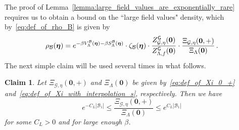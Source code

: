 \documentclass[11pt]{article}
\newtheorem{claim}[theorem]{Claim}
\theoremstyle{definition}
\theoremstyle{remark}
\numberwithin{theorem}{section}
\begin{document}
    \noindent
    The proof of Lemma~\ref{lemma:large_field_values_are_exponentially_rare} requires us to obtain a bound on the ``large field values" density, which by~\eqref{eq:def_of_rho_B} is given by
    \begin{equation*}
        \rho_{\mathcal{B}}(\boldsymbol{\eta}) = e^{-\beta V_{\Lambda}^{\mathcal{B}}(\boldsymbol{\eta})- \beta S_{\Lambda}^{\mathcal{B}}(\boldsymbol{\eta})} \cdot \zeta_{\mathcal{B}}(\boldsymbol{\eta}) \cdot \frac{Z_{\mathcal{G},\eta}^{\sf G}(\mathbf{0})}{Z_{\Lambda,f}^{\sf G}(\mathbf{0})} \cdot \frac{\Xi_{\mathcal{G},\eta}(\mathbf{0},+)}{\Xi_{\Lambda}(\mathbf{0})} \, .
    \end{equation*}
    The next simple claim will be used several times in what follows. 
    \begin{claim}
        \label{claim:two_sided_inequality_for_ratio_of_xi}
        Let $\Xi_{\mathcal{G},\eta}(\mathbf{0},+)$ and $\Xi_{\Lambda}(\mathbf{0})$ be given by~\eqref{eq:def_of_Xi_0_+} and~\eqref{eq:def_of_Xi_with_interpolation_s}, respectively. Then we have 
        \[
        e^{-C_L|\mathcal{B}_1|} \le \frac{\Xi_{\mathcal{G},\eta}(\mathbf{0},+)}{\Xi_{\Lambda}(\mathbf{0})} \le e^{C_L |\mathcal{B}_1|}
        \]
        for some $C_L >0$ and for large enough $\beta$. 
    \end{claim}
\end{document}
